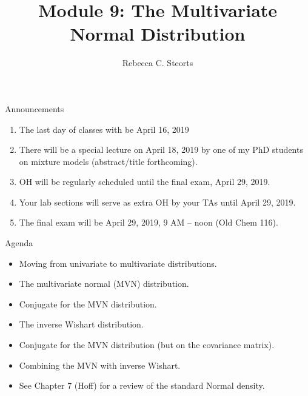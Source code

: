 \documentclass[ignorenonframetext,]{beamer}
\title{Module 9: The Multivariate Normal Distribution}
\author{Rebecca C. Steorts}
\date{}
\providecommand{\tightlist}{%
  \setlength{\itemsep}{0pt}\setlength{\parskip}{0pt}}
\begin{document}
\frame{\titlepage}

\begin{frame}{Announcements}

\begin{enumerate}
\def\labelenumi{\arabic{enumi}.}
\tightlist
\item
  The last day of classes with be April 16, 2019
\item
  There will be a special lecture on April 18, 2019 by one of my PhD
  students on mixture models (abstract/title forthcoming).
\item
  OH will be regularly scheduled until the final exam, April 29, 2019.
\item
  Your lab sections will serve as extra OH by your TAs until April 29,
  2019.
\item
  The final exam will be April 29, 2019, 9 AM -- noon (Old Chem 116).
\end{enumerate}

\end{frame}

\begin{frame}{Agenda}

\begin{itemize}
\item Moving from univariate to multivariate distributions. 
\item The multivariate normal (MVN) distribution.
\item Conjugate for the MVN distribution.
\item The inverse Wishart distribution. 
\item Conjugate for the MVN distribution (but on the covariance matrix). 
\item Combining the MVN with inverse Wishart. 
\item See Chapter 7 (Hoff) for a review of the standard Normal density.
\end{itemize}

\end{frame}
\end{document}
